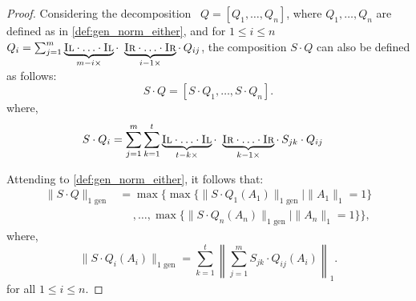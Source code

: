 \begin{proof}
Considering the decomposition  $Q=[Q_1, \ldots, Q_n]$, where $Q_1, \ldots, Q_n$ are defined as in \autoref{def:gen_norm_either}, and for $ 1 \leq i \leq n$  $Q_i = \sum_{j=1}^{m} \underbrace{\textsc{Il} \cdot \ldots \cdot \textsc{Il}}_{m-i \times} \cdot  \underbrace{\textsc{Ir} \cdot \ldots \cdot \textsc{Ir}}_{i-1 \times} \cdot \hspace{2pt} Q_{ij}$, the composition $S \cdot Q$ can also be defined as follows:
\begin{equation}
  S \cdot Q = [S \cdot Q_1, \ldots, S \cdot Q_n].
\end {equation}
where, 
\begin{equation}
  \begin{split}
  S \cdot Q_i & =  \sum_{j=1}^{m} \sum_{k=1}^{t} \underbrace{\textsc{Il} \cdot \ldots \cdot \textsc{Il}}_{t-k \times} \cdot  \underbrace{\textsc{Ir} \cdot \ldots \cdot \textsc{Ir}}_{k-1 \times} \cdot \hspace{2pt} S_{jk} \cdot Q_{ij}
  \end{split}
\end{equation}


Attending to \autoref{def:gen_norm_either}, it follows that:
\begin{equation} \label{eq:sq_decomposed_norm}
  \begin{split}
 \lVert S \cdot  Q \rVert_{1 \text{ gen}} & = \max \{ \max \{\lVert S \cdot Q_1 (A_1) \rVert_{1 \text{ gen}} \mid \|A_1\|_{1} = 1\} \\
& \hspace{15pt} , \ldots, \max \{\lVert S \cdot Q_n (A_n) \rVert_{1 \text{ gen}} \mid \|A_n\|_{1} = 1 \} \},
\end{split}
\end{equation}
where,
\begin{equation} \label{eq:sqi_norm}
\lVert S \cdot Q_i (A_i) \rVert_{1 \text{ gen}} = \sum_{k=1}^{t} \left\| \sum_{j=1}^{m} S_{jk} \cdot Q_{ij} (A_i) \right\|_{1}.
\end{equation} 
for all $1 \leq i \leq n$.


\end{proof}
